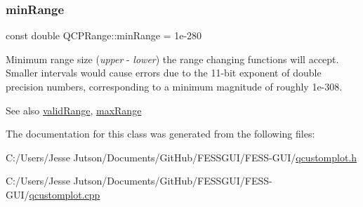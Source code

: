 \subsubsection{\texorpdfstring{min\+Range}{minRange}}
{\footnotesize\ttfamily const double Q\+C\+P\+Range\+::min\+Range = 1e-\/280\hspace{0.3cm}{\ttfamily [static]}}

Minimum range size ({\itshape upper} -\/ {\itshape lower}) the range changing functions will accept. Smaller intervals would cause errors due to the 11-\/bit exponent of double precision numbers, corresponding to a minimum magnitude of roughly 1e-\/308. \begin{DoxySeeAlso}{See also}
\hyperlink{class_q_c_p_range_ab38bd4841c77c7bb86c9eea0f142dcc0}{valid\+Range}, \hyperlink{class_q_c_p_range_a5ca51e7a2dc5dc0d49527ab171fe1f4f}{max\+Range} 
\end{DoxySeeAlso}


The documentation for this class was generated from the following files\+:\begin{DoxyCompactItemize}
\item 
C\+:/\+Users/\+Jesse Jutson/\+Documents/\+Git\+Hub/\+F\+E\+S\+S\+G\+U\+I/\+F\+E\+S\+S-\/\+G\+U\+I/\hyperlink{qcustomplot_8h}{qcustomplot.\+h}\item 
C\+:/\+Users/\+Jesse Jutson/\+Documents/\+Git\+Hub/\+F\+E\+S\+S\+G\+U\+I/\+F\+E\+S\+S-\/\+G\+U\+I/\hyperlink{qcustomplot_8cpp}{qcustomplot.\+cpp}\end{DoxyCompactItemize}
